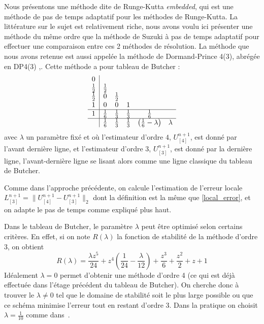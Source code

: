 Nous présentons une méthode dite de Runge-Kutta \emph{embedded}, qui est une méthode de pas de temps adaptatif pour les méthodes de Runge-Kutta. La littérature sur le sujet est relativement riche, nous avons voulu ici présenter une méthode du même ordre que la méthode de Suzuki à pas de temps adaptatif pour effectuer une comparaison entre ces 2 méthodes de résolution. La méthode que nous avons retenue est aussi appelée la méthode de Dormand-Prince 4(3), abrégée en DP4(3) \cite{Dormand:1978},\cite{Dormand:1980}. Cette méthode a pour tableau de Butcher :
$$
  \begin{array}{c|ccccc}
    0           & \\
    \frac{1}{2} & \frac{1}{2} \\
    \frac{1}{2} & 0           & \frac{1}{2} \\
    1           & 0           & 0           & 1           \\
  \hline
    1           & \frac{1}{6} & \frac{1}{3} & \frac{1}{3} & \frac{1}{6} \\
  \hline
                & \frac{1}{6} & \frac{1}{3} & \frac{1}{3} & \left(\frac{1}{6}-\lambda\right) & \lambda
  \end{array}
$$
avec $\lambda$ un paramètre fixé et où l'estimateur d'ordre $4$, $U^{n+1}_{[4]}$, est donné par l'avant dernière ligne, et l'estimateur d'ordre $3$, $U^{n+1}_{[3]}$, est donné par la dernière ligne, l'avant-dernière ligne se lisant alors comme une ligne classique du tableau de Butcher.

Comme dans l'approche précédente, on calcule l'estimation de l'erreur locale $L^{n+1}_{[3]} = \| U^{n+1}_{[4]}-U^{n+1}_{[3]} \|_2$ dont la définition est la même que \eqref{local_error}, et on adapte le pas de temps comme expliqué plus haut.  

Dans le tableau de Butcher, le paramètre $\lambda$ peut être optimisé selon certains critères. En effet, si on note $R(\lambda)$ la fonction de stabilité de la méthode d'ordre $3$, on obtient 
$$
R(\lambda)=  \frac{\lambda z^{5}}{24} + z^{4} \left(\frac{1}{24} - \frac{\lambda}{12}\right) + \frac{z^{3}}{6} + \frac{z^{2}}{2} + z + 1
$$
Idéalement $\lambda=0$ permet d'obtenir une méthode d'ordre 4 (ce qui est déjà effectuée dans l'étage précédent du tableau de Butcher). On cherche donc à trouver le $\lambda\neq 0$ tel que le domaine de stabilité soit le plus large possible ou que ce schéma minimise l'erreur tout en restant d'ordre 3. Dans la pratique on choisit $\lambda = \frac{1}{10}$ comme dans~\cite{Dormand:1978}.
